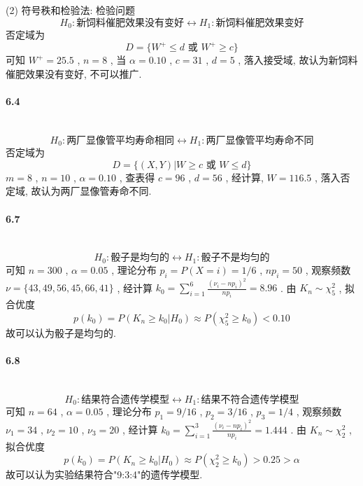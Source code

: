\documentclass[a4paper, UTF8]{ctexart}				%
\numberwithin{equation}{section}				%
\begin{document}
        \noindent(2) 符号秩和检验法: 检验问题
        \[H_0 : \text{新饲料催肥效果没有变好} \leftrightarrow H_1 : \text{新饲料催肥效果变好}\]
        否定域为
        \[D=\{W^+ \le d \text{ 或 } W^+ \ge c\}\]
        可知 $W^+ = 25.5$ , $n = 8$ , 当 $\alpha = 0.10$ , $c = 31$ , $d = 5$ ,
        落入接受域, 故认为新饲料催肥效果没有变好, 不可以推广.\\
    
    \paragraph{6.4}\quad\\
        \[H_0 : \text{两厂显像管平均寿命相同} \leftrightarrow H_1 : \text{两厂显像管平均寿命不同}\]
        否定域为
        \[D=\{(X,Y)|W \ge c \text{ 或 } W \le d\}\]
        $m = 8$ , $n = 10$ , $\alpha = 0.10$ , 查表得 $c = 96$ , $d = 56$ , 经计算, $W = 116.5$ , 落入否定域, 故认为两厂显像管寿命不同.\\
    
    \paragraph{6.7}\quad\\
        \[H_0 : \text{骰子是均匀的} \leftrightarrow H_1 : \text{骰子不是均匀的}\]
        可知 $n = 300$ , $\alpha = 0.05$ , 理论分布 $p_i = P(X = i) = 1/6$ , $n p_i = 50$ , 观察频数 $\nu = \{43, 49, 56, 45, 66, 41\}$ , 经计算 $k_0 = \sum^{6}_{i = 1}\frac{(\nu_i - n p_i)^2}{n p_i} = 8.96$ .
        由 $K_n \sim \chi^2_5$ , 拟合优度 
        \[p(k_0) = P(K_n \ge k_0 | H_0) \approx P(\chi^2_5 \ge k_0) < 0.10 \]
        故可以认为骰子是均匀的.\\
    
    \paragraph{6.8}\quad\\
        \[H_0 : \text{结果符合遗传学模型} \leftrightarrow H_1 : \text{结果不符合遗传学模型}\]
        可知 $n = 64$ , $\alpha = 0.05$ , 理论分布 $p_1 = 9/16$ , $p_2 = 3/16$ , $p_3 = 1/4$ , 观察频数 $\nu_1 = 34$ , $\nu_2 = 10$ , $\nu_3 = 20$ , 经计算 $k_0 = \sum^{3}_{i = 1}\frac{(\nu_i - n p_i)^2}{n p_i} = 1.444$ .
        由 $K_n \sim \chi^2_2$ , 拟合优度 
        \[p(k_0) = P(K_n \ge k_0 | H_0) \approx P(\chi^2_2 \ge k_0) > 0.25 > \alpha\]
        故可以认为实验结果符合"9:3:4"的遗传学模型.\\

    
\end{document}
